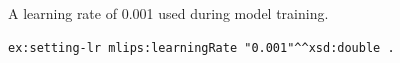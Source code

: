 A learning rate of 0.001 used during model training.
\begin{lstlisting}[language=turtle]
ex:setting-lr mlips:learningRate "0.001"^^xsd:double .
\end{lstlisting}
